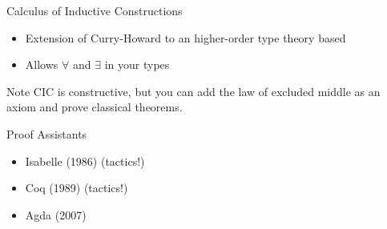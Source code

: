 \documentclass{beamer}
\begin{document}
\begin{frame}{Calculus of Inductive Constructions}
  \begin{itemize}
    \item Extension of Curry-Howard to an higher-order type theory based
    \item Allows $\forall$ and $\exists$ in your types
  \end{itemize}
  \pause
  \begin{alertblock}{Note}
  CIC is constructive, but you can add
  the law of excluded middle as an axiom and prove classical theorems.
  \end{alertblock}
\end{frame}

\begin{frame}{Proof Assistants}
  \begin{itemize}
    \item Isabelle (1986) (tactics!)
    \item Coq (1989) (tactics!)
    \item Agda (2007)
  \end{itemize}
\end{frame}
\end{document}
